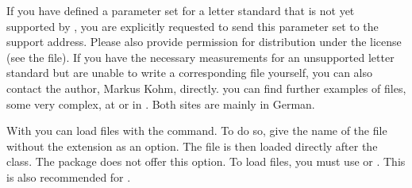 If you have defined a parameter set for a letter standard that is not yet
supported by \KOMAScript{}, you are explicitly requested to send this
parameter set to the \KOMAScript{} support address. Please also provide
permission for distribution under the \KOMAScript{} license (see the
 file). If you have the necessary measurements for an
unsupported letter standard but are unable to write a corresponding 
file yourself, you can also contact the \KOMAScript{} author, Markus Kohm,
directly. you can find further examples of  files, some very
complex, at \cite{wiki-en} or in \cite{DANTE:TK0203:MJK}. Both sites are
mainly in German.


\begin{Declaration}
\end{Declaration}
With  you can load  files
with the  command. To do so, give the name of the
 file without the extension as an option. The
 file is then loaded directly after the class. The
 package does not offer this option.
To load  files, you must use  or
.
This is also recommended for .

